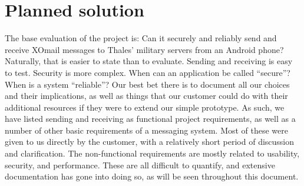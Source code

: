 \section{Planned solution}

The base evaluation of the project is: Can it securely and reliably send and receive XOmail messages to Thales’ military servers from an Android phone? Naturally, that is easier to state than to evaluate. 
\newline
\newline
Sending and receiving is easy to test. Security is more complex. When can an application be called “secure”? When is a system “reliable”? Our best bet there is to document all our choices and their implications, as well as things that our customer could do with their additional resources if they were to extend our simple prototype. 
\newline
\newline
As such, we have listed sending and receiving as functional project requirements, as well as a number of other basic requirements of a messaging system. Most of these were given to us directly by the customer, with a relatively short period of discussion and clarification. 
\newline
\newline
The non-functional requirements are mostly related to usability, security, and performance. These are all difficult to quantify, and extensive documentation has gone into doing so, as will be seen throughout this document. 